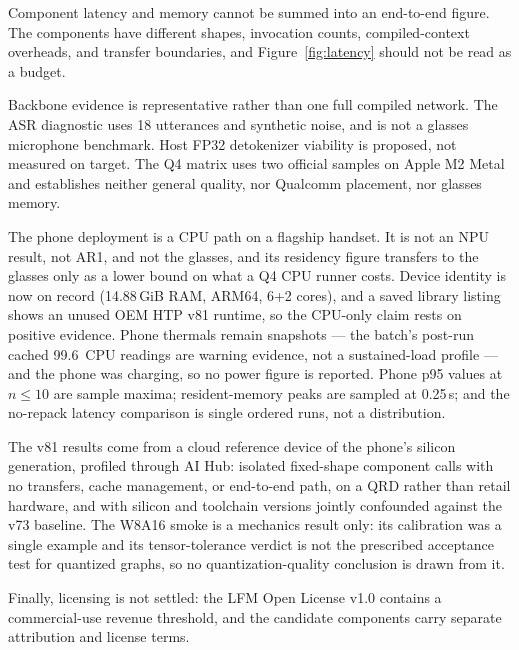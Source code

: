 \documentclass[10pt,twocolumn,letterpaper]{article}
\begin{document}
Component latency and memory cannot be summed into an end-to-end figure. The
components have different shapes, invocation counts, compiled-context
overheads, and transfer boundaries, and Figure~\ref{fig:latency} should not be
read as a budget.

Backbone evidence is representative rather than one full compiled network. The
ASR diagnostic uses 18 utterances and synthetic noise, and is not a glasses
microphone benchmark. Host FP32 detokenizer viability is proposed, not
measured on target. The Q4 matrix uses two official samples on Apple M2 Metal
and establishes neither general quality, nor Qualcomm placement, nor glasses
memory.

The phone deployment is a CPU path on a flagship handset. It is not an NPU
result, not AR1, and not the glasses, and its residency figure transfers to
the glasses only as a lower bound on what a Q4 CPU runner costs. Device
identity is now on record (14.88\,GiB RAM, ARM64, 6+2 cores), and a saved
library listing shows an unused OEM HTP v81 runtime, so the CPU-only claim
rests on positive evidence. Phone thermals remain snapshots --- the batch's
post-run cached 99.6\,\textcelsius{} CPU readings are warning evidence, not a
sustained-load profile --- and the phone was charging, so no power figure is
reported. Phone p95 values at $n \leq 10$ are sample maxima; resident-memory
peaks are sampled at 0.25\,s; and the no-repack latency comparison is single
ordered runs, not a distribution.

The v81 results come from a cloud reference device of the phone's silicon
generation, profiled through AI Hub: isolated fixed-shape component calls with
no transfers, cache management, or end-to-end path, on a QRD rather than
retail hardware, and with silicon and toolchain versions jointly confounded
against the v73 baseline. The W8A16 smoke is a mechanics result only: its
calibration was a single example and its tensor-tolerance verdict is not the
prescribed acceptance test for quantized graphs, so no quantization-quality
conclusion is drawn from it.

Finally, licensing is not settled: the LFM Open License v1.0 contains a
commercial-use revenue threshold, and the candidate components carry separate
attribution and license terms.
\end{document}
